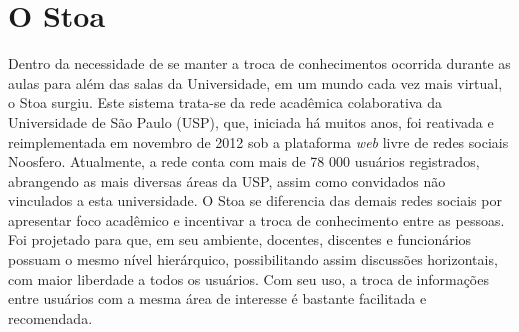 





\section{O Stoa}
\label{sec:stoa}
    Dentro da necessidade de se manter a troca de conhecimentos ocorrida durante as aulas para além das salas da Universidade, em um mundo cada vez mais virtual, o Stoa\cite{stoa} surgiu. Este sistema trata-se da rede acadêmica colaborativa da Universidade de São Paulo (USP), que, iniciada há muitos anos, foi reativada e reimplementada em novembro de 2012 sob a plataforma \emph{web} livre de redes sociais Noosfero\cite{noosfero}. Atualmente, a rede conta com mais de 78 000 usuários registrados, abrangendo as mais diversas áreas da USP, assim como convidados não vinculados a esta universidade.
    O Stoa se diferencia das demais redes sociais por apresentar foco acadêmico e incentivar a troca de conhecimento entre as pessoas. Foi projetado para que, em seu ambiente, docentes, discentes e funcionários possuam o mesmo nível hierárquico, possibilitando assim discussões horizontais, com maior liberdade a todos os usuários. Com seu uso, a troca de informações entre usuários com a mesma área de interesse é bastante facilitada e recomendada.

